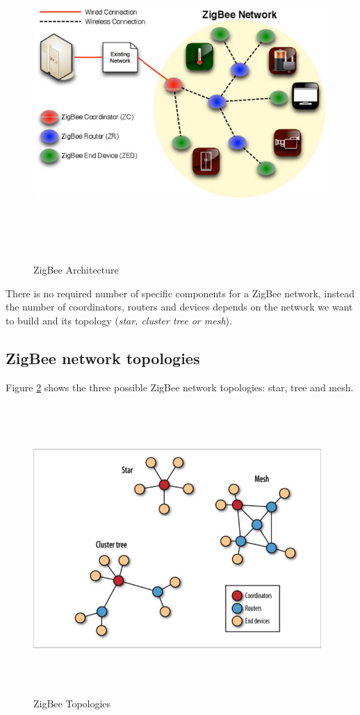 \documentclass[12pt]{report}
\begin{document}
{\begin{figure}[H]
\includegraphics[width=12cm,height=12cm,keepaspectratio]{zigbee_architecture}
\centering
\caption{ZigBee Architecture}
\label{fig:zigbeearch}
\end{figure}

There is no required number of specific components for a ZigBee network, instead the number of coordinators, routers and devices depends on the network we want to build and its topology (\emph{star, cluster tree or mesh}).

\subsection{ZigBee network topologies}
\bigskip
Figure \ref{fig:zigbeetopologies} shows the three possible ZigBee network topologies: star, tree and mesh.

\begin{figure}[H]
\includegraphics[width=11cm,height=11cm,keepaspectratio]{zigbee_topologies}
\centering
\caption{ZigBee Topologies}
\label{fig:zigbeetopologies}
\end{figure}

}
\end{document}

